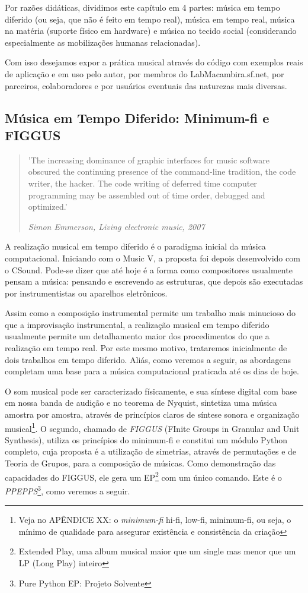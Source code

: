 Por razões didáticas, dividimos este capítulo em 4 partes: música em tempo diferido (ou seja, que não é feito em tempo real),
música em tempo real,  música na matéria (suporte físico em hardware) e música no tecido social
(considerando especialmente as mobilizações humanas relacionadas).

Com isso desejamos expor a prática musical através do código
com exemplos reais de aplicação e em uso pelo autor, por membros do LabMacambira.sf.net,
por parceiros, colaboradores e por usuários eventuais das naturezas mais diversas.

  \subsection{Música em Tempo Diferido: Minimum-fi e FIGGUS}

\begin{quotation}
\small
'The increasing dominance of graphic interfaces for music software obscured 
the continuing presence of the command-line tradition, 
the code writer, the hacker. The code writing of deferred time 
computer programming may be assembled out of time order, debugged and optimized.'

\emph{Simon Emmerson, Living electronic music, 2007}
\end{quotation}

A realização musical em tempo diferido é o paradigma inicial da música computacional.
Iniciando com o Music V, a proposta foi depois desenvolvido com o CSound. Pode-se dizer
que até hoje é a forma como compositores usualmente pensam a música: pensando
e escrevendo as estruturas, que depois são executadas por instrumentistas ou aparelhos eletrônicos.

Assim como a composição instrumental permite um trabalho mais minucioso do que
a improvisação instrumental, a realização musical em tempo diferido usualmente permite um
detalhamento maior dos procedimentos do que a realização em tempo real. Por este
mesmo motivo, trataremos inicialmente de dois trabalhos em tempo diferido.
Aliás, como veremos a seguir, as abordagens completam uma base para a música
computacional praticada até os dias de hoje.

O som musical pode ser caracterizado físicamente, e sua síntese digital com base em nossa banda de audição e no teorema de Nyquist, sintetiza uma música amostra por amostra, através de princípios
claros de síntese sonora e organização musical\footnote{Veja no APÊNDICE XX: o \emph{minimum-fi} hi-fi, low-fi, minimum-fi, ou seja,
o mínimo de qualidade para assegurar existência e consistência
da criação}. O segundo, chamado de \emph{FIGGUS} (FInite
Groups in Granular and Unit Synthesis), utiliza os princípios do minimum-fi e constitui
um módulo Python completo, cuja proposta é a utilização de simetrias, através de
permutações e de Teoria de Grupos, para a composição de músicas. Como demonstração
das capacidades do FIGGUS, ele gera um EP\footnote{Extended Play, uma album musical maior que um single mas menor que um LP (Long Play) inteiro} com um único comando. Este é o
\emph{PPEPPS}\footnote{Pure Python EP: Projeto Solvente}, como veremos a seguir.

